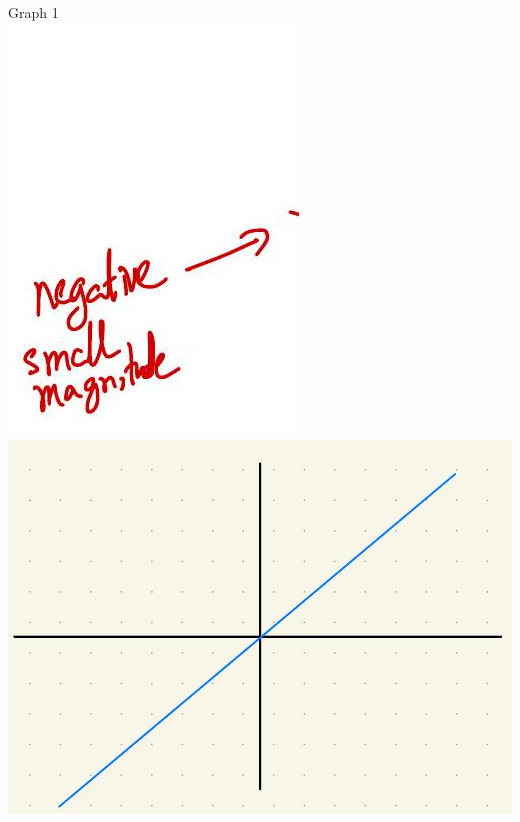 \documentclass[10pt]{article}
\begin{document}
Graph 1\\
\includegraphics[max width=\textwidth, center]{2024_12_26_646789e1ccd1e87aeca8g-07}\\
\includegraphics[max width=\textwidth, center]{2024_12_26_646789e1ccd1e87aeca8g-08}
\end{document}
